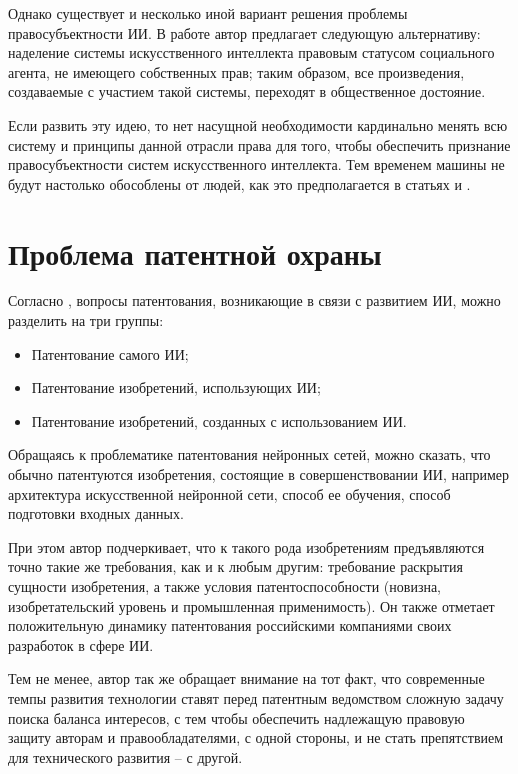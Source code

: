 Однако существует и несколько иной вариант решения проблемы правосубъектности ИИ. В работе
\cite{mor} автор предлагает следующую альтернативу: наделение системы искусственного интеллекта
правовым статусом социального агента, не имеющего собственных прав; таким образом, все произведения,
создаваемые с участием такой системы, переходят в общественное достояние.

Если развить эту идею, то
нет насущной необходимости кардинально менять всю систему и принципы данной отрасли права для того,
чтобы обеспечить признание правосубъектности систем искусственного интеллекта. Тем временем машины
не будут настолько обособлены от людей, как это предполагается в статьях \cite{chel} и \cite{probs}.

\newpage

\section{Проблема патентной охраны}
Согласно \cite{trans}, вопросы патентования, возникающие в связи с развитием ИИ, можно разделить на три группы:

\begin{itemize}
\item Патентование самого ИИ;
\item Патентование изобретений, использующих ИИ;
\item Патентование изобретений, созданных с использованием ИИ.
\end{itemize}

Обращаясь к проблематике патентования нейронных сетей, можно сказать,
что обычно патентуются изобретения, состоящие в совершенствовании ИИ, например
архитектура искусственной нейронной сети, способ ее обучения, способ подготовки
входных данных.

При этом автор \cite{trans} подчеркивает, что к такого рода изобретениям предъявляются
точно такие же требования, как и к любым другим: требование раскрытия сущности
изобретения, а также условия патентоспособности (новизна, изобретательский уровень
и промышленная применимость). Он также отметает положительную динамику патентования
российскими компаниями своих разработок в сфере ИИ.

Тем не менее, автор так же обращает внимание на тот факт, что современные темпы
развития технологии ставят перед патентным ведомством сложную задачу поиска баланса
интересов, с тем чтобы обеспечить надлежащую правовую защиту авторам и правообладателями,
с одной стороны, и не стать препятствием для технического развития – с другой.

